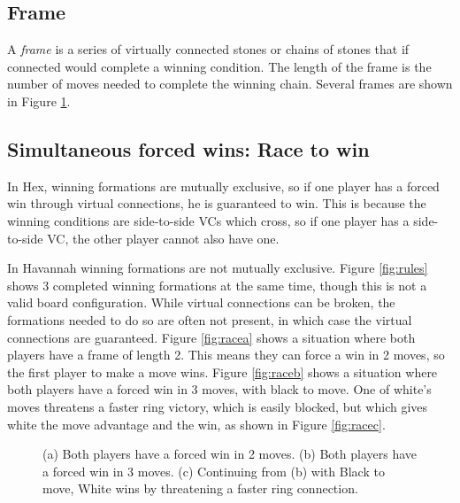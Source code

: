 \subsection{Frame}

A \textit{frame} is a series of virtually connected stones or chains of stones that if connected would complete a winning condition. The length of the frame is the number of moves needed to complete the winning chain. Several frames are shown in Figure \ref{fig:race}.


\subsection{Simultaneous forced wins: Race to win}

In Hex, winning formations are mutually exclusive, so if one player has a forced win through virtual connections, he is guaranteed to win. This is because the winning conditions are side-to-side VCs which cross, so if one player has a side-to-side VC, the other player cannot also have one.

In Havannah winning formations are not mutually exclusive. Figure \ref{fig:rules} shows 3 completed winning formations at the same time, though this is not a valid board configuration. While virtual connections can be broken, the formations needed to do so are often not present, in which case the virtual connections are guaranteed. Figure \ref{fig:racea} shows a situation where both players have a frame of length 2. This means they can force a win in 2 moves, so the first player to make a move wins. Figure \ref{fig:raceb} shows a situation where both players have a forced win in 3 moves, with black to move. One of white's moves threatens a faster ring victory, which is easily blocked, but which gives white the move advantage and the win, as shown in Figure \ref{fig:racec}.


\begin{figure}
	\centering
	\caption{(a) Both players have a forced win in 2 moves. (b) Both players have a forced win in 3 moves. (c) Continuing from (b) with Black to move, White wins
by threatening a faster ring connection.}
	\label{fig:race}
\end{figure}


